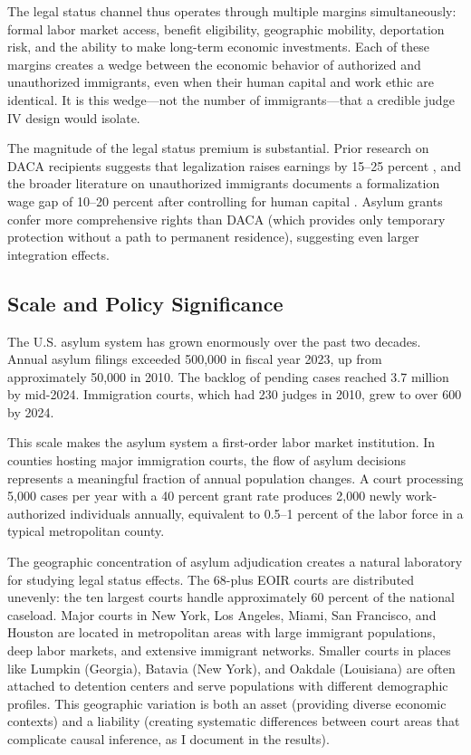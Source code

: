 \documentclass[12pt]{article}
\begin{document}
The legal status channel thus operates through multiple margins simultaneously: formal labor market access, benefit eligibility, geographic mobility, deportation risk, and the ability to make long-term economic investments. Each of these margins creates a wedge between the economic behavior of authorized and unauthorized immigrants, even when their human capital and work ethic are identical. It is this wedge---not the number of immigrants---that a credible judge IV design would isolate.

The magnitude of the legal status premium is substantial. Prior research on DACA recipients suggests that legalization raises earnings by 15--25 percent \citep{becker2022legal}, and the broader literature on unauthorized immigrants documents a formalization wage gap of 10--20 percent after controlling for human capital \citep{dustmann2016economics}. Asylum grants confer more comprehensive rights than DACA (which provides only temporary protection without a path to permanent residence), suggesting even larger integration effects.

\subsection{Scale and Policy Significance}

The U.S. asylum system has grown enormously over the past two decades. Annual asylum filings exceeded 500,000 in fiscal year 2023, up from approximately 50,000 in 2010. The backlog of pending cases reached 3.7 million by mid-2024. Immigration courts, which had 230 judges in 2010, grew to over 600 by 2024.

This scale makes the asylum system a first-order labor market institution. In counties hosting major immigration courts, the flow of asylum decisions represents a meaningful fraction of annual population changes. A court processing 5,000 cases per year with a 40 percent grant rate produces 2,000 newly work-authorized individuals annually, equivalent to 0.5--1 percent of the labor force in a typical metropolitan county.

The geographic concentration of asylum adjudication creates a natural laboratory for studying legal status effects. The 68-plus EOIR courts are distributed unevenly: the ten largest courts handle approximately 60 percent of the national caseload. Major courts in New York, Los Angeles, Miami, San Francisco, and Houston are located in metropolitan areas with large immigrant populations, deep labor markets, and extensive immigrant networks. Smaller courts in places like Lumpkin (Georgia), Batavia (New York), and Oakdale (Louisiana) are often attached to detention centers and serve populations with different demographic profiles. This geographic variation is both an asset (providing diverse economic contexts) and a liability (creating systematic differences between court areas that complicate causal inference, as I document in the results).
\end{document}
